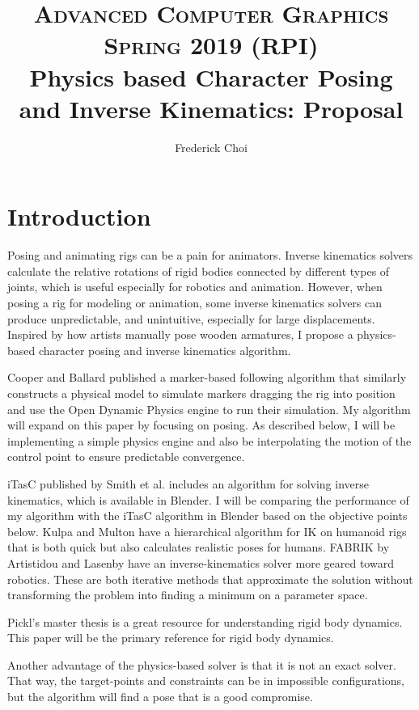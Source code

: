 \documentclass[10pt,twocolumn,letterpaper]{article}
\title{
        \usefont{OT1}{bch}{b}{n}
        \normalfont \normalsize \textsc{Advanced Computer Graphics Spring 2019 (RPI)} \\ [10pt]
        \huge Physics based Character Posing and Inverse Kinematics: Proposal \\
}
\author[0]{Frederick Choi}
\begin{document}
\maketitle


\section*{Introduction}
Posing and animating rigs can be a pain for animators. Inverse kinematics solvers calculate the relative rotations of rigid bodies connected by different types of joints, which is useful especially for robotics and animation. However, when posing a rig for modeling or animation, some inverse kinematics solvers can produce unpredictable, and unintuitive, especially for large displacements. Inspired by how artists manually pose wooden armatures, I propose a physics-based character posing and inverse kinematics algorithm.

Cooper and Ballard \cite{Co} published a marker-based following algorithm that similarly constructs a physical model to simulate markers dragging the rig into position and use the Open Dynamic Physics engine to run their simulation. My algorithm will expand on this paper by focusing on posing. As described below, I will be implementing a simple physics engine and also be interpolating the motion of the control point to ensure predictable convergence.

iTasC published by Smith et al. \cite{Sm} includes an algorithm for solving inverse kinematics, which is available in Blender. I will be comparing the performance of my algorithm with the iTasC algorithm in Blender based on the objective points below. Kulpa and Multon \cite{Ku} have a hierarchical algorithm for IK on humanoid rigs that is both quick but also calculates realistic poses for humans. FABRIK by Artistidou and Lasenby \cite{Ar} have an inverse-kinematics solver more geared toward robotics. These are both iterative methods that approximate the solution without transforming the problem into finding a minimum on a parameter space. 

Pickl's master thesis \cite{Pi} is a great resource for understanding rigid body dynamics. This paper will be the primary reference for rigid body dynamics.

Another advantage of the physics-based solver is that it is not an exact solver. That way, the target-points and constraints can be in impossible configurations, but the algorithm will find a pose that is a good compromise.
\end{document}
